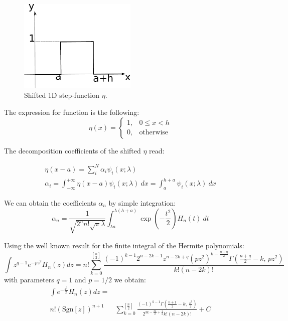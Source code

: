 \begin{figure}[H]
\label{pic: stepFunction}
\begin{center}
\includegraphics[width=0.5\textwidth]{Hermite/Fig/StepFunction.pdf}
\end{center}
\caption[Shifted 1D step-function $\eta$]{Shifted 1D step-function $\eta$.}
\end{figure}

The expression for function is the following:
\begin{equation}
\eta(x)	=	
\begin{cases}
1, & 0\leq x<h\\
0, & \mbox{otherwise}
\end{cases}
\end{equation}
 
The decomposition coefficients of the shifted $\eta$ read:

\begin{eqnarray}
\eta(x-a)=\sum_{i}^{N}\alpha_{i}\psi_{i}(x;\lambda)\\
\alpha_{i}=\int_{-\infty}^{+\infty}\eta(x-a)\psi_{i}(x;\lambda)~ dx = \int_{a}^{h+a}\psi_{i}(x;\lambda)~dx 
\end{eqnarray}

We can obtain the coefficients $\alpha_n$ by simple integration:
\begin{equation}
\alpha_{n}=\frac{1}{\sqrt{2^{n}n!\sqrt{\pi}\lambda}}\int_{\lambda a}^{\lambda(h+a)}\exp(-\frac{t^{2}}{2})H_{n}(t)~ dt 
\end{equation}

Using the well known result for the finite integral of the Hermite polynomials:
\begin{equation}
 \int z^{q-1}e^{-pz^{2}}H_{n}(z)dz=n!\sum_{k=0}^{\left[\frac{n}{2}\right]}\frac{(-1)^{k-1}2^{n-2k-1}z^{n-2k+q}\left(pz^{2}\right)^{k-\frac{n+q}{2}}\Gamma\left(\frac{n+q}{2}-k,\, pz^{2}\right)}{k!(n-2k)!}
\end{equation}
with parameters $q=1$ and $p=1/2$ we obtain:
\begin{eqnarray}
 \int e^{-\frac{z^{2}}{2}}H_{n}(z)dz =\\ n!\left(\mbox{Sgn}[z]\right)^{n+1}&\sum_{k=0}^{\left[\frac{n}{2}\right]}\frac{(-1)^{k-1}\Gamma\left(\frac{n+1}{2}-k,\,\frac{z^{2}}{2}\right)}{2^{3k-\frac{3n}{2}+\frac{1}{2}}k!(n-2k)!}+C
\end{eqnarray}


